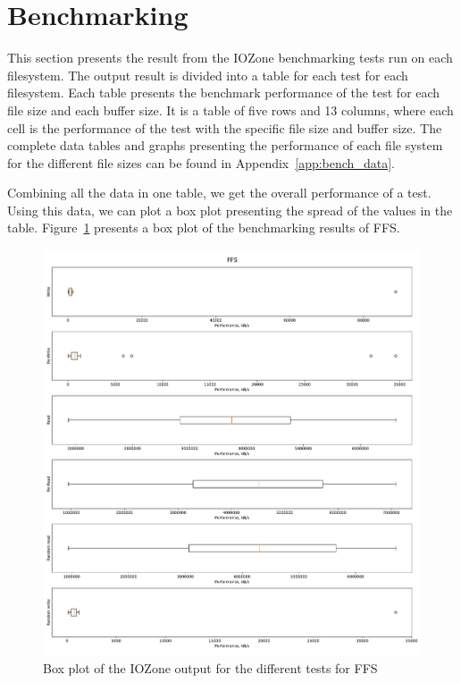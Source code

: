 \section{Benchmarking}
\label{sec:res_bench}
This section presents the result from the IOZone benchmarking tests run on each filesystem. The output result is divided into a table for each test for each filesystem. Each table presents the benchmark performance of the test for each file size and each buffer size. It is a table of five rows and 13 columns, where each cell is the performance of the test with the specific file size and buffer size. The complete data tables and graphs presenting the performance of each file system for the different file sizes can be found in Appendix~\ref{app:bench_data}.

Combining all the data in one table, we get the overall performance of a test. Using this data, we can plot a box plot presenting the spread of the values in the table. Figure~\ref{fig:res_box_ffs} presents a box plot of the benchmarking results of FFS.

\begin{figure}[!htb]
	\label{fig:res_box_ffs}
	\begin{center}
		\includegraphics[width=1.0\textwidth]{figures/benchmarking/ffs/FFS-box.pdf}
	\end{center}
	\caption{Box plot of the IOZone output for the different tests for FFS}
\end{figure}


